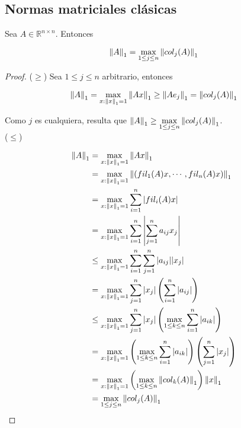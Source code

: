 \subsection{Normas matriciales clásicas}

\begin{propo}
Sea $A \in \mathbb{R}^{n \times n}$. Entonces

\[\left\lVert A\right\rVert_{1} = \max\limits_{1 \leq j \leq n} \left\lVert col_j(A)\right\rVert_1\]

\begin{proof}
($\geq$) Sea $1 \leq j \leq n$ arbitrario, entonces

\[\left\lVert A\right\rVert_1 = \max\limits_{x : \left\lVert x\right\rVert_1 = 1} \left\lVert Ax\right\rVert_1 \geq \left\lVert A e_j\right\rVert_1 = \left\lVert col_j(A)\right\rVert_1\]

Como $j$ es cualquiera, resulta que $\left\lVert A\right\rVert_1 \geq \max\limits_{1 \leq j \leq n} \left\lVert col_j(A)\right\rVert_1$.\\[0.25cm]

($\leq$)

\begin{align*}
\left\lVert A\right\rVert_1 &= \max\limits_{x : \left\lVert x\right\rVert_1 = 1} \left\lVert Ax\right\rVert_1\\
& = \max\limits_{x : \left\lVert x\right\rVert_1 = 1} \left\lVert(fil_1(A) x, \cdots, fil_n(A) x)\right\rVert_1\\
& = \max\limits_{x : \left\lVert x\right\rVert_1 = 1} \sum_{i = 1}^n |fil_i(A) x|\\
& = \max\limits_{x : \left\lVert x\right\rVert_1 = 1} \sum_{i = 1}^n \left|\sum_{j = 1}^n a_{ij} x_j\right|\\
& \leq \max\limits_{x : \left\lVert x\right\rVert_1 = 1} \sum_{i = 1}^n \sum_{j = 1}^n |a_{ij}| |x_j|\\
& = \max\limits_{x : \left\lVert x\right\rVert_1 = 1} \sum_{j = 1}^n |x_j| \left(\sum_{i = 1}^n |a_{ij}|\right)\\
& \leq \max\limits_{x : \left\lVert x\right\rVert_1 = 1} \sum_{j = 1}^n |x_j| \left(\max\limits_{1 \leq k \leq n} \sum_{i = 1}^n |a_{ik}|\right)\\
& = \max\limits_{x : \left\lVert x\right\rVert_1 = 1} \left(\max\limits_{1 \leq k \leq n} \sum_{i = 1}^n |a_{ik}|\right)\left(\sum_{j = 1}^n |x_j|\right)\\
& = \max\limits_{x : \left\lVert x\right\rVert_1 = 1} \left(\max\limits_{1 \leq k \leq n} \left\lVert col_k(A)\right\rVert_1\right) \left\lVert x\right\rVert_1\\
& = \max \limits_{1 \leq j \leq n}\left\lVert col_j(A)\right\rVert_1
\end{align*}

\end{proof}
\end{propo}

